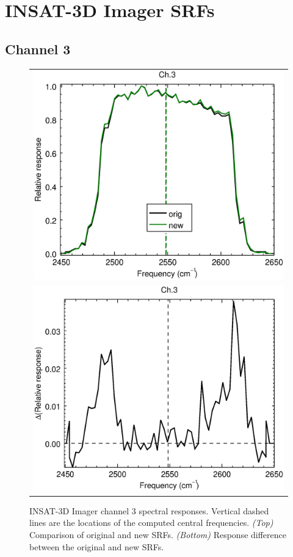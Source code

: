 \section{INSAT-3D Imager SRFs}
\label{app.imgr_srf_data_plots}

\subsection{Channel 3}
\begin{figure}[H]
  \label{fig:imgr_ch3}
  \centering
  \begin{tabular}{c}
    \includegraphics[scale=0.55]{graphics/imgr/srf/imgr_insat3d-3.eps} \\
    \includegraphics[scale=0.55]{graphics/imgr/srf/imgr_insat3d-3.difference.eps}
  \end{tabular}
  \caption{INSAT-3D Imager channel 3 spectral responses. Vertical dashed lines are the locations of the computed central frequencies. \emph{(Top)} Comparison of original and new SRFs. \emph{(Bottom)} Response difference between the original and new SRFs.}
\end{figure}

